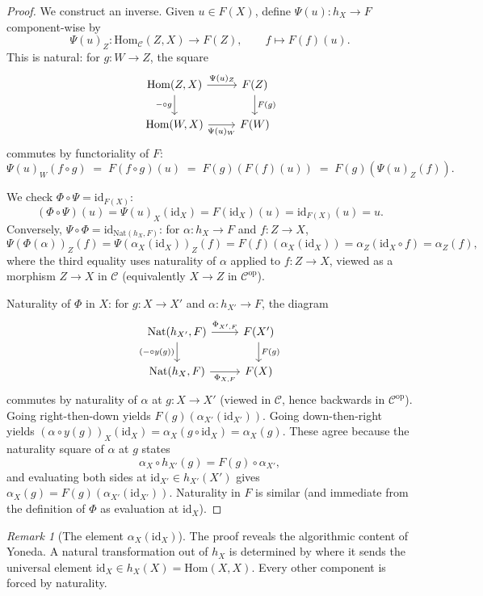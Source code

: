 \documentclass[12pt]{article}
\theoremstyle{definition}
\theoremstyle{remark}
\newtheorem{remark}[theorem]{Remark}
\begin{document}
\begin{proof}
We construct an inverse. Given $u \in F(X)$, define $\Psi(u)\colon h_X \to F$ component-wise by
\[
\Psi(u)_Z\colon \mathrm{Hom}_{\mathcal{C}}(Z, X) \to F(Z),\qquad f \longmapsto F(f)(u).
\]
This is natural: for $g\colon W \to Z$, the square
\[
\begin{tikzcd}
\mathrm{Hom}(Z, X) \arrow[r, "\Psi(u)_Z"] \arrow[d, "- \circ g"'] & F(Z) \arrow[d, "F(g)"] \\
\mathrm{Hom}(W, X) \arrow[r, "\Psi(u)_W"'] & F(W)
\end{tikzcd}
\]
commutes by functoriality of $F$:
\[
\Psi(u)_W(f \circ g) \;=\; F(f \circ g)(u) \;=\; F(g)(F(f)(u)) \;=\; F(g)(\Psi(u)_Z(f)).
\]

We check $\Phi \circ \Psi = \mathrm{id}_{F(X)}$:
\[
(\Phi \circ \Psi)(u) = \Psi(u)_X(\mathrm{id}_X) = F(\mathrm{id}_X)(u) = \mathrm{id}_{F(X)}(u) = u.
\]
Conversely, $\Psi \circ \Phi = \mathrm{id}_{\mathrm{Nat}(h_X, F)}$: for $\alpha\colon h_X \to F$ and $f\colon Z \to X$,
\[
\Psi(\Phi(\alpha))_Z(f) = \Psi(\alpha_X(\mathrm{id}_X))_Z(f) = F(f)(\alpha_X(\mathrm{id}_X)) = \alpha_Z(\mathrm{id}_X \circ f) = \alpha_Z(f),
\]
where the third equality uses naturality of $\alpha$ applied to $f\colon Z \to X$, viewed as a morphism $Z \to X$ in $\mathcal{C}$ (equivalently $X \to Z$ in $\mathcal{C}^{\mathrm{op}}$).

Naturality of $\Phi$ in $X$: for $g\colon X \to X'$ and $\alpha\colon h_{X'} \to F$, the diagram
\[
\begin{tikzcd}
\mathrm{Nat}(h_{X'}, F) \arrow[r, "\Phi_{X', F}"] \arrow[d, "(- \circ y(g))"'] & F(X') \arrow[d, "F(g)"] \\
\mathrm{Nat}(h_X, F) \arrow[r, "\Phi_{X, F}"'] & F(X)
\end{tikzcd}
\]
commutes by naturality of $\alpha$ at $g\colon X \to X'$ (viewed in $\mathcal{C}$, hence backwards in $\mathcal{C}^{\mathrm{op}}$). Going right-then-down yields $F(g)(\alpha_{X'}(\mathrm{id}_{X'}))$. Going down-then-right yields $(\alpha \circ y(g))_{X}(\mathrm{id}_X) = \alpha_X(g \circ \mathrm{id}_X) = \alpha_X(g)$. These agree because the naturality square of $\alpha$ at $g$ states
\[
\alpha_X \circ h_{X'}(g) = F(g) \circ \alpha_{X'},
\]
and evaluating both sides at $\mathrm{id}_{X'} \in h_{X'}(X')$ gives $\alpha_X(g) = F(g)(\alpha_{X'}(\mathrm{id}_{X'}))$. Naturality in $F$ is similar (and immediate from the definition of $\Phi$ as evaluation at $\mathrm{id}_X$).
\end{proof}

\begin{remark}[The element $\alpha_X(\mathrm{id}_X)$]
The proof reveals the algorithmic content of Yoneda. A natural transformation out of $h_X$ is determined by where it sends the universal element $\mathrm{id}_X \in h_X(X) = \mathrm{Hom}(X, X)$. Every other component is forced by naturality.
\end{remark}
\end{document}
